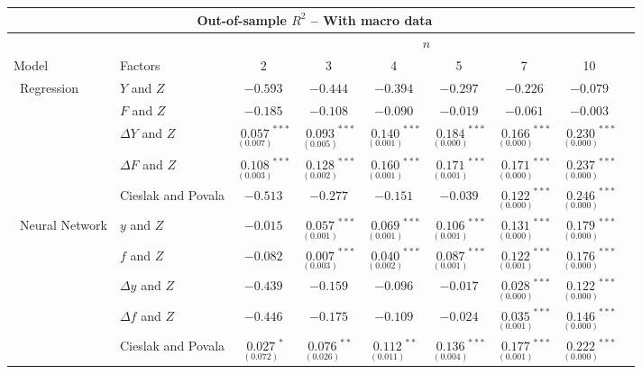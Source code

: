 \begin{tabular}{llccccccc}
\hline
	\multicolumn{8}{c}{Out-of-sample $R^2$ -- With macro data}\\\hline
	&& \multicolumn{6}{c}{$n$}\\\cline{3-8}
Model & Factors  & 2  & 3      & 4       & 5       & 7 & 10 \\
\hline
\ Regression & $Y$ and $Z$ & $-0.593$ & $-0.444$ & $-0.394$ & $-0.297$ & $-0.226$ & $-0.079$ \\
 & $F$ and $Z$ & $-0.185$ & $-0.108$ & $-0.090$ & $-0.019$ & $-0.061$ & $-0.003$ \\
 & $\Delta Y$ and $Z$ & $\underset{(0.007)}{0.057}^{***}$ & $\underset{(0.005)}{0.093}^{***}$ & $\underset{(0.001)}{0.140}^{***}$ & $\underset{(0.000)}{0.184}^{***}$ & $\underset{(0.000)}{0.166}^{***}$ & $\underset{(0.000)}{0.230}^{***}$ \\
 & $\Delta F$ and $Z$ & $\underset{(0.003)}{0.108}^{***}$ & $\underset{(0.002)}{0.128}^{***}$ & $\underset{(0.001)}{0.160}^{***}$ & $\underset{(0.001)}{0.171}^{***}$ & $\underset{(0.000)}{0.171}^{***}$ & $\underset{(0.000)}{0.237}^{***}$ \\
 & Cieslak and Povala & $-0.513$ & $-0.277$ & $-0.151$ & $-0.039$ & $\underset{(0.000)}{0.122}^{***}$ & $\underset{(0.000)}{0.246}^{***}$ \\
\hline
\ Neural Network & $y$ and $Z$ & $-0.015$ & $\underset{(0.001)}{0.057}^{***}$ & $\underset{(0.001)}{0.069}^{***}$ & $\underset{(0.001)}{0.106}^{***}$ & $\underset{(0.000)}{0.131}^{***}$ & $\underset{(0.000)}{0.179}^{***}$ \\
 & $f$ and $Z$ & $-0.082$ & $\underset{(0.003)}{0.007}^{***}$ & $\underset{(0.002)}{0.040}^{***}$ & $\underset{(0.001)}{0.087}^{***}$ & $\underset{(0.001)}{0.122}^{***}$ & $\underset{(0.000)}{0.176}^{***}$ \\
 & $\Delta y$ and $Z$ & $-0.439$ & $-0.159$ & $-0.096$ & $-0.017$ & $\underset{(0.000)}{0.028}^{***}$ & $\underset{(0.000)}{0.122}^{***}$ \\
 & $\Delta f$ and $Z$ & $-0.446$ & $-0.175$ & $-0.109$ & $-0.024$ & $\underset{(0.001)}{0.035}^{***}$ & $\underset{(0.000)}{0.146}^{***}$ \\
 & Cieslak and Povala & $\underset{(0.072)}{0.027}^{*}$ & $\underset{(0.026)}{0.076}^{**}$ & $\underset{(0.011)}{0.112}^{**}$ & $\underset{(0.004)}{0.136}^{***}$ & $\underset{(0.001)}{0.177}^{***}$ & $\underset{(0.000)}{0.222}^{***}$ \\
\hline
    \end{tabular}
